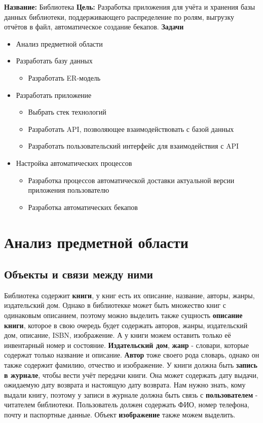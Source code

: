 \documentclass[a4paper,14pt]{extarticle}
\begin{document}
\textbf{Название: }Библиотека\bigbreak
\textbf{Цель: }Разработка приложения для учёта и хранения базы данных библиотеки, 
поддерживающего распределение по ролям, выгрузку отчётов в файл, автоматическое
создание бекапов.\bigbreak
\textbf{Задачи}
\begin{itemize}
    \item Анализ предметной области
    \item Разработать базу данных
    \begin{itemize}
      \item Разработать ER-модель
    \end{itemize}
    \item Разработать приложение
    \begin{itemize}
      \item Выбрать стек технологий
      \item Разработать API, позволяющее взаимодействовать с базой данных
      \item Разработать пользовательский интерфейс для взаимодействия с API
    \end{itemize}
    \item Настройка автоматических процессов
    \begin{itemize}
      \item Разработка процессов автоматической доставки актуальной версии приложения пользователю
      \item Разработка автоматических бекапов
    \end{itemize}
\end{itemize}

\section{Анализ предметной области}

\subsection{Объекты и связи между ними}
Библиотека содержит \textbf{книги}, у книг есть 
их описание, название, авторы, жанры, издательский дом. Однако
в библиотекке может быть множество книг с одинаковым описанием, 
поэтому можно выделить также сущность \textbf{описание книги}, 
которое в свою очередь будет содержать авторов, жанры, издательский дом, 
описание, ISBN, изображение. А у книги можем оставить только её
инвентарный номер и состояние. \textbf{Издательский дом}, \textbf{жанр} - 
словари, которые содержат только название и описание. \textbf{Автор} тоже
своего рода словарь, однако он также содержит фамилию, отчество и изображение.
У книги должна быть \textbf{запись в журнале}, чтобы вести учёт передачи книги. 
Она может содержать дату выдачи, ожидаемую дату возврата и настоящую дату возврата.
Нам нужно знать, кому выдали книгу, поэтому у записи в журнале должна быть связь с
\textbf{пользователем} - читателем библиотеки. Пользователь должен содержать ФИО, 
номер телефона, почту и паспортные данные. Объект \textbf{изображение} также можем 
выделить.
\end{document}
